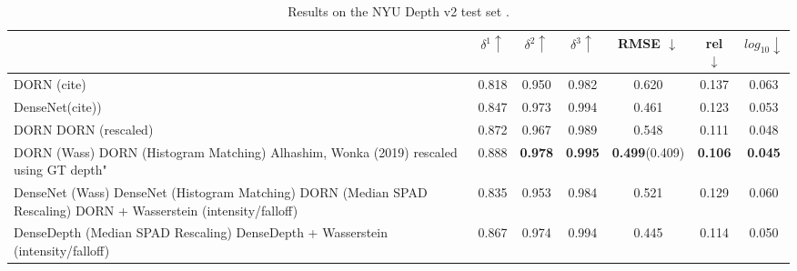 \begin{table*}
\begin{center}
\begin{tabular}{lccc|ccc}
  \toprule
    & $\delta^1 \uparrow$ & $\delta^2\uparrow$ & $\delta^3 \uparrow$ & RMSE $\downarrow$ & rel $\downarrow$ & $log_{10} \downarrow$ \\
  \midrule
  DORN (cite)&0.818&0.950&0.982&0.620&0.137&0.063 \\
DenseNet(cite))&0.847&0.973&0.994&0.461&0.123&0.053 \\
  \midrule
  DORN  DORN (rescaled) & 0.872 & 0.967 & 0.989 & 0.548 & 0.111 & 0.048 \\
  DORN (Wass)
  DORN (Histogram Matching)
 Alhashim, Wonka (2019) rescaled using GT depth"&0.888&\textbf{0.978}&\textbf{0.995}&\textbf{0.499}(0.409)&\textbf{0.106}&\textbf{0.045} \\
  DenseNet (Wass)
  DenseNet (Histogram Matching)
  \midrule
  DORN (Median SPAD Rescaling)
  DORN + Wasserstein (intensity/falloff) & 0.835 & 0.953 & 0.984 & 0.521 & 0.129 & 0.060 \\
  DenseDepth (Median SPAD Rescaling)
  DenseDepth + Wasserstein (intensity/falloff) & 0.867 & 0.974 & 0.994 & 0.445 & 0.114 & 0.050 \\
  \midrule
  \bottomrule
\end{tabular} 
\end{center}
\caption{Results on the NYU Depth v2 test set \cite{nyudepth}.}
\end{table*}


